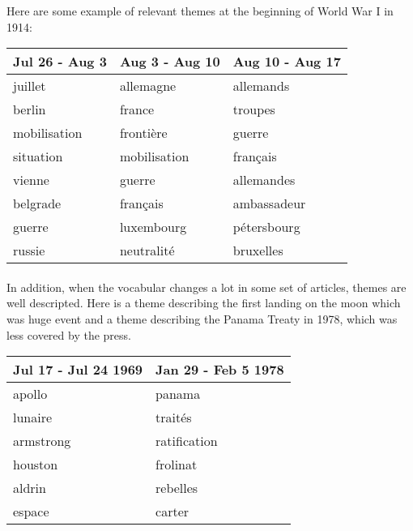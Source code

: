 Here are some example of relevant themes at the beginning of World War I in 1914:

\begin{center}
\begin{tabular}{|l|l|l|}
  \hline
  Jul 26 - Aug 3 & Aug 3 - Aug 10 & Aug 10 - Aug 17 \\
  \hline
  juillet & allemagne & allemands \\
  berlin & france & troupes \\
  mobilisation & frontière & guerre \\
  situation & mobilisation & français \\
  vienne & guerre & allemandes \\
  belgrade & français & ambassadeur \\
  guerre & luxembourg & pétersbourg \\
  russie & neutralité & bruxelles \\
  \hline
\end{tabular}
\end{center}

\paragraph{}
In addition, when the vocabular changes a lot in some set of articles, themes are well descripted. Here is a theme describing the first landing on the moon which was huge event and a theme describing the Panama Treaty in 1978, which was less covered by the press.


\begin{center}
\begin{tabular}{|l|l|}
  \hline
  Jul 17 - Jul 24 1969 & Jan 29 - Feb 5 1978 \\
  \hline
  apollo & panama \\
  lunaire & traités \\
  armstrong & ratification \\
  houston & frolinat \\
  aldrin & rebelles \\
  espace & carter \\
  \hline
\end{tabular}
\end{center}


